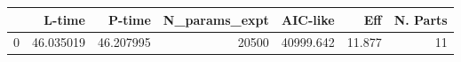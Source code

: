 \begin{tabular}{lrrrrrr}
\toprule
{} &     L-time &     P-time &  N\_params\_expt &   AIC-like &     Eff &  N. Parts \\
\midrule
0 &  46.035019 &  46.207995 &          20500 &  40999.642 &  11.877 &        11 \\
\bottomrule
\end{tabular}
